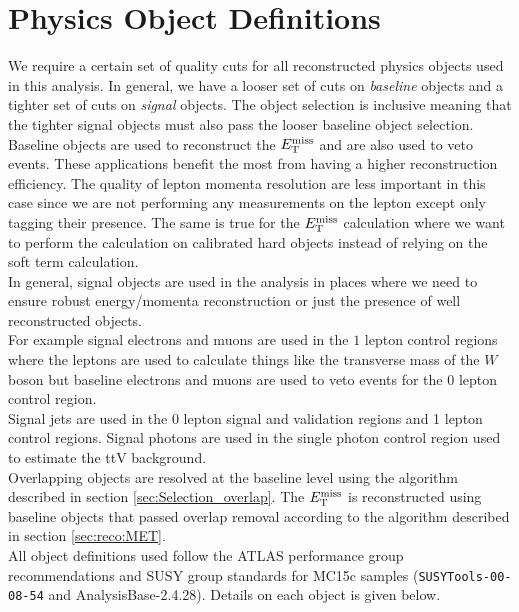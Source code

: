 \chapter{Physics Object Definitions}
\label{chap:objects}

\indent We require a certain set of quality cuts for all reconstructed physics objects used in this analysis.  In general, we have a looser set of cuts on {\it baseline} objects and a tighter set of cuts on {\it signal} objects.  The object selection is inclusive meaning that the tighter signal objects must also pass the looser baseline object selection.  \\

\indent Baseline objects are used to reconstruct the $E_{\mathrm{T}}^{\mathrm{miss}}$ and are also used to veto events.  These applications benefit the most from having a higher reconstruction efficiency.  The quality of lepton momenta resolution are less important in this case since we are not performing any measurements on the lepton except only tagging their presence.  The same is true for the $E_{\mathrm{T}}^{\mathrm{miss}}$ calculation where we want to perform the calculation on calibrated hard objects instead of relying on the soft term calculation.  \\

\indent In general, signal objects are used in the analysis in places where we need to ensure robust energy/momenta reconstruction or just the presence of well reconstructed objects.  \\

\indent For example signal electrons and muons are used in the $1$ lepton control regions where the leptons are used to calculate things like the transverse mass of the $W$ boson but baseline electrons and muons are used to veto events for the $0$ lepton control region. \\

\indent Signal jets are used in the 0 lepton signal and validation regions and 1 lepton control regions.  Signal photons are used in the single photon control region used to estimate the ttV background. \\

\indent Overlapping objects are resolved at the baseline level using the algorithm described in section \ref{sec:Selection_overlap}.  The $E_{\mathrm{T}}^{\mathrm{miss}}$ is reconstructed using baseline objects that passed overlap removal according to the algorithm described in section \ref{sec:reco:MET}. \\

\indent All object definitions used follow the ATLAS performance group recommendations and SUSY group standards for MC15c samples ({\tt SUSYTools-00-08-54} and AnalysisBase-2.4.28).  Details on each object is given below. \\

